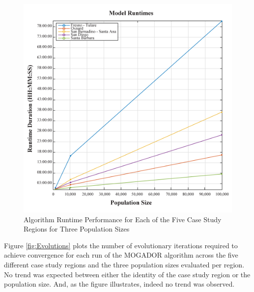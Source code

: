     \begin{figure}[!h]
        \begin{center}
        \includegraphics[width=5.5in]{figures/Runtimes.png}
        \caption{Algorithm Runtime Performance for Each of the Five Case Study Regions for Three Population Sizes}
        \label{fig:Runtimes}
        \end{center}
    \end{figure}
    
Figure \ref{fig:Evolutions} plots the number of evolutionary iterations required to achieve convergence for each run of the MOGADOR algorithm across the five different case study regions and the three population sizes evaluated per region. No trend was expected between either the identity of the case study region or the population size. And, as the figure illustrates, indeed no trend was observed. 
    
